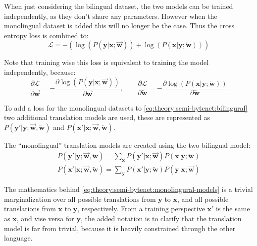 When just considering the bilingual dataset, the two models can be trained independently, as they don't share any parameters. However when the monolingual dataset is added this will no longer be the case. Thus the cross entropy loss is combined to:
\begin{equation}
\mathcal{L} = -\left(
    \log(P(\mathbf{y}|\mathbf{x};\overrightarrow{\mathbf{w}})) +
    \log(P(\mathbf{x}|\mathbf{y};\overleftarrow{\mathbf{w}}))
\right)
\label{eq:theory:semi-bytenet:bilingural}
\end{equation}

Note that training wise this loss is equivalent to training the model independently, because:
\begin{equation}
\frac{\partial \mathcal{L}}{\partial \overrightarrow{\mathbf{w}}} = -\frac{\partial \log(P(\mathbf{y}|\mathbf{x};\overrightarrow{\mathbf{w}}))}{\partial \overrightarrow{\mathbf{w}}}, \qquad \frac{\partial \mathcal{L}}{\partial \overleftarrow{\mathbf{w}}} = -\frac{\partial \log(P(\mathbf{x}|\mathbf{y};\overleftarrow{\mathbf{w}}))}{\partial \overleftarrow{\mathbf{w}}}
\end{equation}

To add a loss for the monolingual datasets to \eqref{eq:theory:semi-bytenet:bilingural} two additional translation models are used, these are represented as $P(\mathbf{y'}|\mathbf{y};\overrightarrow{\mathbf{w}},\overleftarrow{\mathbf{w}})$ and $P(\mathbf{x'}|\mathbf{x};\overrightarrow{\mathbf{w}},\overleftarrow{\mathbf{w}})$.

The ``monolingual'' translation models are created using the two bilingual model:
\begin{equation}
\begin{aligned}
P(\mathbf{y'}|\mathbf{y};\overrightarrow{\mathbf{w}},\overleftarrow{\mathbf{w}}) = \sum_\mathbf{x} P(\mathbf{y'}|\mathbf{x};\overrightarrow{\mathbf{w}}) P(\mathbf{x}|\mathbf{y};\overleftarrow{\mathbf{w}}) \\
P(\mathbf{x'}|\mathbf{x};\overrightarrow{\mathbf{w}},\overleftarrow{\mathbf{w}}) = \sum_\mathbf{y} P(\mathbf{x'}|\mathbf{y};\overleftarrow{\mathbf{w}}) P(\mathbf{y}|\mathbf{x};\overrightarrow{\mathbf{w}})
\end{aligned}
\label{eq:theory:semi-bytenet:monolingural-models}
\end{equation}

The mathematics behind \eqref{eq:theory:semi-bytenet:monolingural-models} is a trivial marginalization over all possible translations from $\mathbf{y}$ to $\mathbf{x}$, and all possible translations from $\mathbf{x}$ to $\mathbf{y}$, respectively. From a training perspective $\mathbf{x'}$ is the same as $\mathbf{x}$, and vise versa for $\mathbf{y}$, the added notation is to clarify that the translation model is far from trivial, because it is heavily constrained through the other language.


